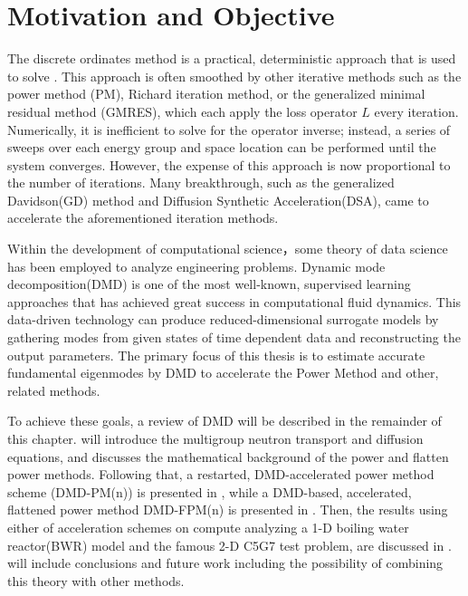 \section{Motivation and Objective}
The discrete ordinates method is a practical, deterministic approach that is used to solve .
This approach is often smoothed by other iterative methods such as the power method (PM), Richard iteration method, or the generalized minimal residual method (GMRES)\cite{saad1986gmres}, which each apply the loss operator $L$ every iteration.
Numerically, it is inefficient to solve for the operator inverse; instead, a series of sweeps over each energy group and space location can be performed until the system converges.  
However, the expense of this approach is now proportional to the number of iterations.
Many breakthrough, such as the generalized Davidson(GD) method\cite{larsen1984diffusion} and Diffusion Synthetic Acceleration(DSA)\cite{hamilton2011numerical}, came to accelerate the aforementioned iteration methods.

Within the development of computational science，some theory of data science has been employed to analyze engineering problems.
Dynamic mode decomposition(DMD) is one of the most well-known, supervised learning approaches that has achieved great success in computational fluid dynamics.
This data-driven technology can produce reduced-dimensional surrogate models by gathering modes from given states of time dependent data and reconstructing the output parameters.
The primary focus of this thesis is to estimate accurate fundamental eigenmodes by DMD to accelerate the Power Method and other, related methods.

To achieve these goals, a review of DMD will be described in the remainder of this chapter.
 will introduce the multigroup neutron transport and diffusion equations, and  discusses the mathematical background of the power and flatten power methods.
Following that, a restarted, DMD-accelerated power method scheme (DMD-PM(n)) is presented in , while a DMD-based, accelerated, flattened power
method DMD-FPM(n) is presented in .
Then, the results using either of acceleration schemes on compute analyzing a 1-D boiling water reactor(BWR) model and the famous 2-D C5G7 test problem, are discussed in .
 will include conclusions and future work including the possibility of combining this theory with other methods. 


